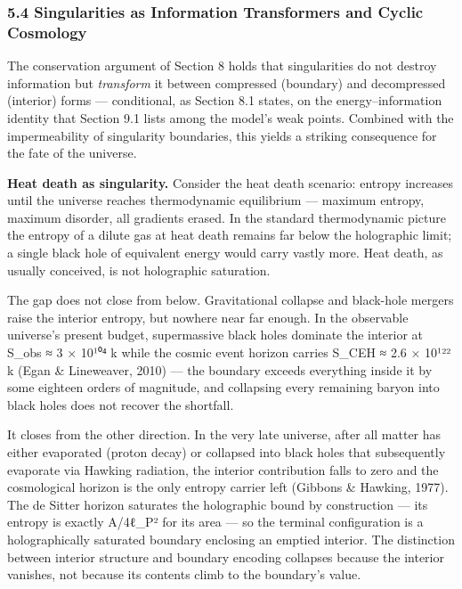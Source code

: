 \documentclass[
]{article}
\begin{document}
\hypertarget{singularities-as-information-transformers-and-cyclic-cosmology}{%
\subsubsection{5.4 Singularities as Information Transformers and Cyclic
Cosmology}\label{singularities-as-information-transformers-and-cyclic-cosmology}}

The conservation argument of Section 8 holds that singularities do not
destroy information but \emph{transform} it between compressed
(boundary) and decompressed (interior) forms --- conditional, as Section
8.1 states, on the energy--information identity that Section 9.1 lists
among the model's weak points. Combined with the impermeability of
singularity boundaries, this yields a striking consequence for the fate
of the universe.

\textbf{Heat death as singularity.} Consider the heat death scenario:
entropy increases until the universe reaches thermodynamic equilibrium
--- maximum entropy, maximum disorder, all gradients erased. In the
standard thermodynamic picture the entropy of a dilute gas at heat death
remains far below the holographic limit; a single black hole of
equivalent energy would carry vastly more. Heat death, as usually
conceived, is not holographic saturation.

The gap does not close from below. Gravitational collapse and black-hole
mergers raise the interior entropy, but nowhere near far enough. In the
observable universe's present budget, supermassive black holes dominate
the interior at S\_obs ≈ 3 × 10¹⁰⁴ k while the cosmic event horizon
carries S\_CEH ≈ 2.6 × 10¹²² k (Egan \& Lineweaver, 2010) --- the
boundary exceeds everything inside it by some eighteen orders of
magnitude, and collapsing every remaining baryon into black holes does
not recover the shortfall.

It closes from the other direction. In the very late universe, after all
matter has either evaporated (proton decay) or collapsed into black
holes that subsequently evaporate via Hawking radiation, the interior
contribution falls to zero and the cosmological horizon is the only
entropy carrier left (Gibbons \& Hawking, 1977). The de Sitter horizon
saturates the holographic bound by construction --- its entropy is
exactly A/4ℓ\_P² for its area --- so the terminal configuration is a
holographically saturated boundary enclosing an emptied interior. The
distinction between interior structure and boundary encoding collapses
because the interior vanishes, not because its contents climb to the
boundary's value.
\end{document}
